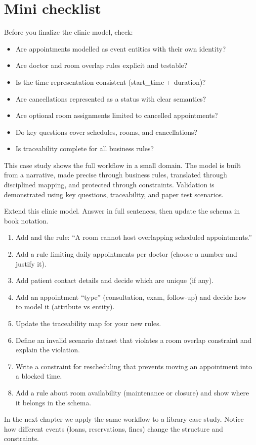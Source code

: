 \section{Mini checklist}
Before you finalize the clinic model, check:
\begin{itemize}[leftmargin=*,nosep]
  \item Are appointments modelled as event entities with their own identity?
  \item Are doctor and room overlap rules explicit and testable?
  \item Is the time representation consistent (start\_time + duration)?
  \item Are cancellations represented as a status with clear semantics?
  \item Are optional room assignments limited to cancelled appointments?
  \item Do key questions cover schedules, rooms, and cancellations?
  \item Is traceability complete for all business rules?
\end{itemize}

\begin{chaptersummary}
This case study shows the full workflow in a small domain.
The model is built from a narrative, made precise through business rules, translated through disciplined mapping, and protected through constraints.
Validation is demonstrated using key questions, traceability, and paper test scenarios.
\end{chaptersummary}

\begin{exercisebox}
Extend this clinic model.
Answer in full sentences, then update the schema in book notation.
\begin{enumerate}[label=\arabic*.]
  \item Add  and the rule: “A room cannot host overlapping scheduled appointments.”
  \item Add a rule limiting daily appointments per doctor (choose a number and justify it).
  \item Add patient contact details and decide which are unique (if any).
  \item Add an appointment “type” (consultation, exam, follow-up) and decide how to model it (attribute vs entity).
  \item Update the traceability map for your new rules.
  \item Define an invalid scenario dataset that violates a room overlap constraint and explain the violation.
  \item Write a constraint for rescheduling that prevents moving an appointment into a blocked time.
  \item Add a rule about room availability (maintenance or closure) and show where it belongs in the schema.
\end{enumerate}
\end{exercisebox}

In the next chapter we apply the same workflow to a library case study.
Notice how different events (loans, reservations, fines) change the structure and constraints.
